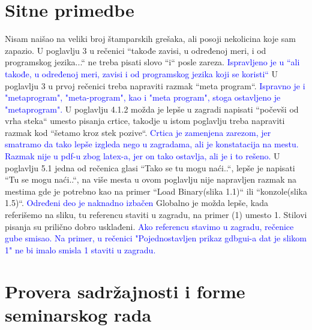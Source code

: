 \documentclass[a4paper]{report}
\newcommand{\odgovor}[1]{\textcolor{blue}{#1}}
\begin{document}
\section{Sitne primedbe}
Nisam naišao na veliki broj štamparskih grešaka, ali posoji nekolicina koje sam zapazio. U poglavlju 3 u rečenici ``takođe zavisi, u određenoj meri, i od programskog jezika...`` ne treba pisati slovo ``i`` posle zareza. 
\odgovor{Ispravljeno je u ``ali takođe, u određenoj meri, zavisi i od programskog jezika koji se koristi``}
U poglavlju 3 u prvoj rečenici treba napraviti razmak ``meta program``.
\odgovor{Ispravno je i "metaprogram", "meta-program", kao i "meta program", stoga ostavljeno je "metaprogram".} 
U poglavlju 4.1.2 možda je lepše u zagradi napisati ``počevši od vrha steka`` umesto pisanja crtice, takodje u istom poglavlju treba napraviti razmak kod ``šetamo kroz stek pozive``.  
\odgovor{Crtica je zamenjena zarezom, jer smatramo da tako lepše izgleda nego u zagradama, ali je konstatacija na mestu. Razmak nije u pdf-u zbog latex-a, jer on tako ostavlja, ali je i to rešeno.}
U poglavlju 5.1 jedna od rečenica glasi ``Tako se tu mogu naći..``, lepše je napisati ``Tu se mogu naći..``, na više mesta u ovom poglavlju nije napravljen razmak 
na mestima gde je potrebno kao na primer ``Load Binary(slika 1.1)`` ili ``konzole(slika 1.5)``.
\odgovor{Određeni deo je naknadno izbačen}
Globalno je možda lepše, kada referišemo na sliku, tu referencu staviti u zagradu, na primer (1) umesto 1. Stilovi pisanja su prilično dobro usklađeni.
\odgovor{Ako referencu stavimo u zagradu, rečenice gube smisao. Na primer, u rečenici "Pojednostavljen prikaz gdbgui-a dat je slikom 1" ne bi imalo smisla 1 staviti u zagradu.}

\section{Provera sadržajnosti i forme seminarskog rada}
\end{document}
